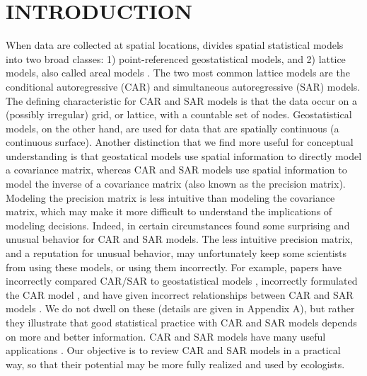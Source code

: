 \documentclass[11pt, titlepage]{article}\usepackage[]{graphicx}\usepackage[]{color}
\begin{document}

\newpage


\section*{INTRODUCTION}


When data are collected at spatial locations, \citet[][p. 8]{Cres:stat:1993} divides spatial statistical models into two broad classes: 1) point-referenced geostatistical models, and 2) lattice models, also called areal models \citep{Bane:Carl:Gelf:hier:2004}.  The two most common lattice models are the conditional autoregressive (CAR) and simultaneous autoregressive (SAR) models. The defining characteristic for CAR and SAR models is that the data occur on a (possibly irregular) grid, or lattice, with a countable set of nodes.  Geostatistical models, on the other hand, are used for data that are spatially continuous (a continuous surface). Another distinction that we find more useful for conceptual understanding is that geostatical models use spatial information to directly model a covariance matrix, whereas CAR and SAR models use spatial information to model the inverse of a covariance matrix (also known as the precision matrix).  Modeling the precision matrix is less intuitive than modeling the covariance matrix, which may make it more difficult to understand the implications of modeling decisions.  Indeed, in certain circumstances \citet{Wall:clos:2004} found some surprising and unusual behavior for CAR and SAR models. The less intuitive precision matrix, and a reputation for unusual behavior, may unfortunately keep some scientists from using these models, or using them incorrectly. For example, papers have incorrectly compared CAR/SAR to geostatistical models \citep[e.g.,][]{Begu:Puey:comp:2009}, incorrectly formulated the CAR model \citep[e.g.,][]{Keit:Bjor:Dixo:Citr:acco:2002}, and have given incorrect relationships between CAR and SAR models \citep[e.g.,][]{Dorm:etal:meth:2007}. We do not dwell on these (details are given in Appendix A), but rather they illustrate that good statistical practice with CAR and SAR models depends on more and better information. CAR and SAR models have many useful applications \citep[e.g.,][]{Gelf:Schm:Wu:Sila:Lati:mode:2005, Lati:Wu:Gelf:Sila:buil:2006, Mago:Ray:John:Valk:Daws:Bowm:mode:2007, Hank:Hoot:circ:2013}.  Our objective is to review CAR and SAR models in a practical way, so that their potential may be more fully realized and used by ecologists.
\end{document}
